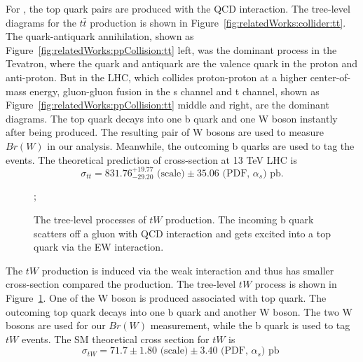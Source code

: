 \noindent For \ttbar, the top quark pairs are produced with the QCD interaction. The tree-level diagrams for the $t\bar{t}$ production is shown in Figure~\ref{fig:relatedWorks:collider:tt}. The quark-antiquark annihilation, shown as Figure~\ref{fig:relatedWorks:ppCollision:tt} left, was the dominant process in the Tevatron, where the quark and antiquark are the valence quark in the proton and anti-proton. But in the LHC, which collides proton-proton at a higher center-of-mass energy, gluon-gluon fusion in the s channel and t channel, shown as  Figure~\ref{fig:relatedWorks:ppCollision:tt} middle and right, are the dominant diagrams. The top quark decays into one b quark and one W boson instantly after being produced. The resulting pair of W bosons are used to measure $Br(W)$ in our analysis. Meanwhile, the outcoming b quarks are used to tag the \ttbar events. The theoretical prediction of \ttbar cross-section at 13 TeV LHC is
\begin{equation}
    \sigma_{tt} = 831.76 ^{+19.77}_{-29.20}\text{~(scale)}\pm35.06 \text{~(PDF, $\alpha_s$)~pb} .
\end{equation}



\begin{figure}[ht]
    \centering
    ; \qquad
    \caption{The tree-level processes of $tW$ production. The incoming b quark scatters off a gluon with QCD interaction and gets excited into a top quark via the EW interaction.}
    \label{fig:relatedWorks:ppCollision:tw}
\end{figure}

\noindent The $tW$ production is induced via the weak interaction and thus has smaller cross-section compared the \ttbar production. The tree-level $tW$ process is shown in Figure~\ref{fig:relatedWorks:ppCollision:tw}. One of the W boson is produced associated with top quark. The outcoming top quark decays into one b quark and another W boson. The two W bosons are used for our $Br(W)$ measurement, while the b quark is used to tag $tW$ events. The SM theoretical cross section for $tW$ is 
\begin{equation}
    \sigma_{tW} = 71.7 \pm 1.80 \text{~(scale)} \pm 3.40 \text{~(PDF, $\alpha_s$)~pb }
\end{equation}


